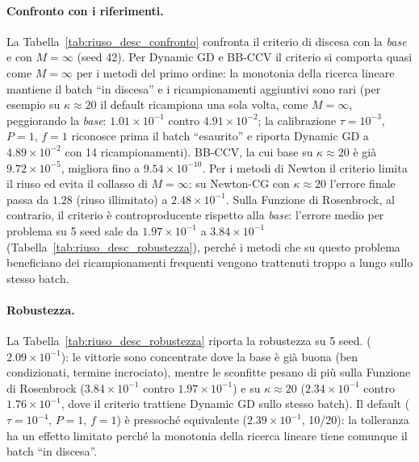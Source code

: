 \documentclass[a4paper,12pt]{article}
\numberwithin{equation}{section}
\numberwithin{figure}{section}
\numberwithin{table}{section}
\begin{document}
\paragraph{Confronto con i riferimenti.}
La Tabella~\ref{tab:riuso_desc_confronto} confronta il criterio di discesa
con la \emph{base} e con $M=\infty$ (seed 42). Per Dynamic GD e BB-CCV il
criterio si comporta quasi come $M=\infty$ per i metodi del primo ordine: la
monotonia della ricerca lineare mantiene il batch ``in discesa'' e i
ricampionamenti aggiuntivi sono rari (per esempio su $\kappa\approx20$ il
default ricampiona una sola volta, come $M=\infty$, peggiorando la
\emph{base}: $1.01\times10^{-1}$ contro $4.91\times10^{-2}$; la calibrazione
$\tau=10^{-3}$, $P=1$, $f=1$ riconosce prima il batch ``esaurito'' e riporta
Dynamic GD a $4.89\times10^{-2}$ con 14 ricampionamenti). BB-CCV, la cui base
su $\kappa\approx20$ è già $9.72\times10^{-5}$, migliora fino a
$9.54\times10^{-10}$. Per i metodi di Newton il criterio limita il riuso ed
evita il collasso di $M=\infty$: su Newton-CG con $\kappa\approx20$ l'errore
finale passa da $1.28$ (riuso illimitato) a $2.48\times10^{-1}$. Sulla Funzione di Rosenbrock,
al contrario, il criterio è controproducente rispetto alla
\emph{base}: l'errore medio per problema su 5 seed sale da
$1.97\times10^{-1}$ a $3.84\times10^{-1}$
(Tabella~\ref{tab:riuso_desc_robustezza}), perché i metodi che su questo
problema beneficiano dei ricampionamenti frequenti vengono trattenuti troppo
a lungo sullo stesso batch.

\paragraph{Robustezza.}
La Tabella~\ref{tab:riuso_desc_robustezza} riporta la robustezza su 5 seed.
($2.09\times10^{-1}$): le vittorie sono concentrate dove la base è già buona
(ben condizionati, termine incrociato), mentre le sconfitte pesano di più
sulla Funzione di Rosenbrock ($3.84\times10^{-1}$ contro $1.97\times10^{-1}$) e su
$\kappa\approx20$ ($2.34\times10^{-1}$ contro $1.76\times10^{-1}$, dove il
criterio trattiene Dynamic GD sullo stesso batch). Il default
($\tau=10^{-4}$, $P=1$, $f=1$) è pressoché equivalente
($2.39\times10^{-1}$, 10/20): la tolleranza ha un effetto limitato perché la
monotonia della ricerca lineare tiene comunque il batch ``in discesa''.
\end{document}
